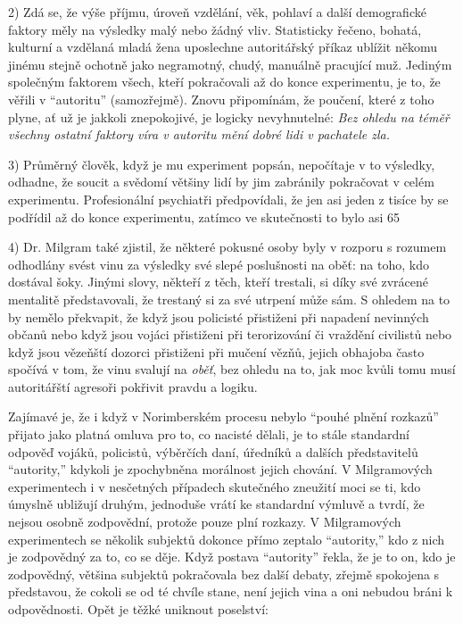 \documentclass{book}
\begin{document}
2) Zdá se, že výše příjmu, úroveň vzdělání, věk, pohlaví a další demografické faktory měly na výsledky malý nebo žádný vliv. Statisticky řečeno, bohatá, kulturní a vzdělaná mladá žena uposlechne autoritářský příkaz ublížit někomu jinému stejně ochotně jako negramotný, chudý, manuálně pracující muž. Jediným společným faktorem všech, kteří pokračovali až do konce experimentu, je to, že věřili v \enquote{autoritu} (samozřejmě). Znovu připomínám, že poučení, které z toho plyne, ať už je jakkoli znepokojivé, je logicky nevyhnutelné: \emph{Bez ohledu na téměř všechny ostatní faktory víra v autoritu mění dobré lidi v pachatele zla.}

3) Průměrný člověk, když je mu experiment popsán, nepočítaje v to výsledky, odhadne, že soucit a svědomí většiny lidí by jim zabránily pokračovat v celém experimentu. Profesionální psychiatři předpovídali, že jen asi jeden z tisíce by se podřídil až do konce experimentu, zatímco ve skutečnosti to bylo asi 65 %

4) Dr. Milgram také zjistil, že některé pokusné osoby byly v rozporu s rozumem odhodlány svést vinu za výsledky své slepé poslušnosti na oběť: na toho, kdo dostával šoky. Jinými slovy, někteří z těch, kteří trestali, si díky své zvrácené mentalitě představovali, že trestaný si za své utrpení může sám. S ohledem na to by nemělo překvapit, že když jsou policisté přistiženi při napadení nevinných občanů nebo když jsou vojáci přistiženi při terorizování či vraždění civilistů nebo když jsou vězeňští dozorci přistiženi při mučení vězňů, jejich obhajoba často spočívá v tom, že vinu svalují na \emph{oběť}, bez ohledu na to, jak moc kvůli tomu musí autoritářští agresoři pokřivit pravdu a logiku.

Zajímavé je, že i když v Norimberském procesu nebylo \enquote{pouhé plnění rozkazů} přijato jako platná omluva pro to, co nacisté dělali, je to stále standardní odpověď vojáků, policistů, výběrčích daní, úředníků a dalších představitelů \enquote{autority,} kdykoli je zpochybněna morálnost jejich chování. V Milgramových experimentech i v nesčetných případech skutečného zneužití moci se ti, kdo úmyslně ubližují druhým, jednoduše vrátí ke standardní výmluvě a tvrdí, že nejsou osobně zodpovědní, protože pouze plní rozkazy. V Milgramových experimentech se několik subjektů dokonce přímo zeptalo \enquote{autority,} kdo z nich je zodpovědný za to, co se děje. Když postava \enquote{autority} řekla, že je to on, kdo je zodpovědný, většina subjektů pokračovala bez další debaty, zřejmě spokojena s představou, že cokoli se od té chvíle stane, není jejich vina a oni nebudou bráni k odpovědnosti. Opět je těžké uniknout poselství:
\end{document}
